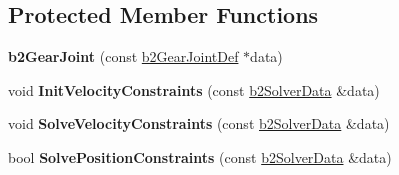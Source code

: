 \subsection*{Protected Member Functions}
\begin{DoxyCompactItemize}
\item 
{\bfseries b2\+Gear\+Joint} (const \hyperlink{structb2_gear_joint_def}{b2\+Gear\+Joint\+Def} $\ast$data)\hypertarget{classb2_gear_joint_a4b247c79e74cb1e5b906527fe7d151ce}{}\label{classb2_gear_joint_a4b247c79e74cb1e5b906527fe7d151ce}

\item 
void {\bfseries Init\+Velocity\+Constraints} (const \hyperlink{structb2_solver_data}{b2\+Solver\+Data} \&data)\hypertarget{classb2_gear_joint_ad1d8e7b5434ad899c510dd223a72e6cb}{}\label{classb2_gear_joint_ad1d8e7b5434ad899c510dd223a72e6cb}

\item 
void {\bfseries Solve\+Velocity\+Constraints} (const \hyperlink{structb2_solver_data}{b2\+Solver\+Data} \&data)\hypertarget{classb2_gear_joint_a7684e28e93a3dc88a0e84424be937355}{}\label{classb2_gear_joint_a7684e28e93a3dc88a0e84424be937355}

\item 
bool {\bfseries Solve\+Position\+Constraints} (const \hyperlink{structb2_solver_data}{b2\+Solver\+Data} \&data)\hypertarget{classb2_gear_joint_a6be119465783ecb3f055695c7a713de2}{}\label{classb2_gear_joint_a6be119465783ecb3f055695c7a713de2}

\end{DoxyCompactItemize}
